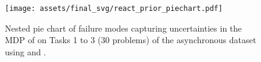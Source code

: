 \begin{figure}[!h]
    \centering
    \texttt{[image: assets/final\_svg/react\_prior\_piechart.pdf]}
    \caption{Nested pie chart of failure modes capturing uncertainties in the MDP of \gptfo{} \reactp{} on Tasks 1 to 3 (30 problems) of the asynchronous dataset using \gptfo{} \react{} and \gptfo{} \reactp{}.}
    \label{fig:piechart_followup}
\end{figure}
